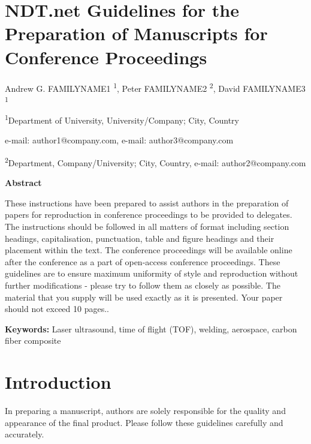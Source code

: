 \documentclass[12pt]{article}
\renewcommand{\_}{\kern-1.5pt\textunderscore\kern-1.5pt}
\begin{document}
\section*{\centering NDT.net Guidelines for the Preparation of Manuscripts for Conference Proceedings}

\vspace{\baselineskip}
\begin{Center}
Andrew G. FAMILYNAME1 \textsuperscript{1}, Peter FAMILYNAME2 \textsuperscript{2}, David FAMILYNAME3 \textsuperscript{1}
\end{Center}

\vspace{\baselineskip}
\begin{Center}
\textsuperscript{1}{Department of University, University/Company; City, Country}
\end{Center}
\begin{Center}
{ e-mail: author1@company.com, e-mail: author3@company.com}
\end{Center}
\begin{Center}
\textsuperscript{2}{Department, Company/University; City, Country, e-mail: author2@company.com}
\end{Center}

\vspace{\baselineskip}
\begin{FlushLeft}
\textbf{Abstract}
\end{FlushLeft}
{ These instructions have been prepared to assist authors in the preparation of papers for reproduction in conference proceedings to be provided to delegates. The instructions should be followed in all matters of format including section headings, capitalisation, punctuation, table and figure headings and their placement within the text. The conference proceedings will be available online after the conference as a part of open-access conference proceedings. These guidelines are to ensure maximum uniformity of style and reproduction without further modifications - please try to follow them as closely as possible. The material that you supply will be used exactly as it is presented. Your paper should not exceed 10 pages..\par}

\vspace{\baselineskip}
{ \textbf{Keywords:} Laser ultrasound, time of flight (TOF), welding, aerospace, carbon fiber composite}

\section{Introduction}
In preparing a manuscript, authors are solely responsible for the quality and appearance of the final product. Please follow these guidelines \cite{Udpa2020} carefully and accurately. 
\end{document}
